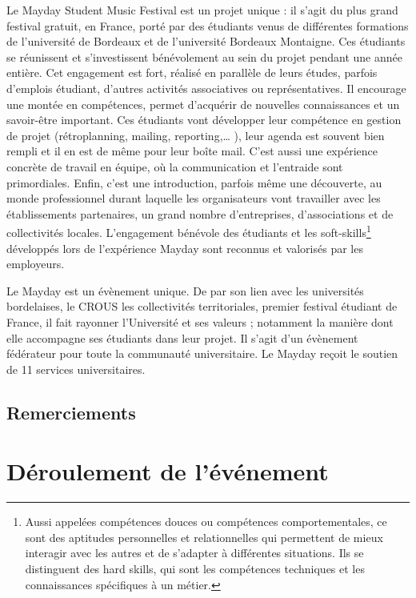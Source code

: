 \documentclass[12pt,a4paper]{report}
\begin{document}
Le Mayday Student Music Festival est un projet unique : il s'agit du plus grand festival gratuit, en France, porté par des étudiants venus de différentes formations de l’université de Bordeaux et de l’université Bordeaux Montaigne. Ces étudiants se réunissent et s’investissent bénévolement au sein du projet pendant une année entière. Cet engagement est fort, réalisé en parallèle de leurs études, parfois d’emplois étudiant, d’autres activités associatives ou représentatives. Il encourage une montée en compétences, permet d'acquérir de nouvelles connaissances et un savoir-être important. Ces étudiants vont développer leur compétence en gestion de projet (rétroplanning, mailing, reporting,… ), leur agenda est souvent bien rempli et il en est de même pour leur boîte mail. C’est aussi une expérience concrète de travail en équipe, où la communication et l'entraide sont primordiales. Enfin, c’est une introduction, parfois même une découverte, au monde professionnel durant laquelle les organisateurs vont travailler avec les établissements partenaires, un grand nombre d'entreprises, d’associations et de collectivités locales. L’engagement bénévole des étudiants et les soft-skills\footnote{ Aussi appelées compétences douces ou compétences comportementales, ce sont des aptitudes personnelles et relationnelles qui permettent de mieux interagir avec les autres et de s'adapter à différentes situations. Ils se distinguent des hard skills, qui sont les compétences techniques et les connaissances spécifiques à un métier.} développés lors de l’expérience Mayday sont reconnus et valorisés par les employeurs.

Le Mayday est un évènement unique. De par son lien avec les universités bordelaises, le CROUS les collectivités territoriales, premier festival étudiant de France, il fait rayonner l’Université et ses valeurs ; notamment la manière dont elle accompagne ses étudiants dans leur projet. Il s’agit d’un évènement fédérateur pour toute la communauté universitaire. Le Mayday reçoit le soutien de 11 services universitaires. 

\section*{Remerciements}

\vfill

\chapter{Déroulement de l'événement}
\end{document}
